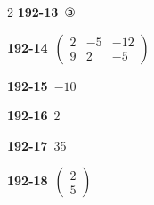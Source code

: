 \documentclass[10pt,a4paper]{article}
\begin{document}
\begin{multicols}{2}
\noindent\textbf{192-13}\ ③\par
\noindent\textbf{192-14}\ $\begin{pmatrix} 2 & -5 & -12 \\ 9 & 2 & -5 \end{pmatrix}$\par
\noindent\textbf{192-15}\ $-10$\par
\noindent\textbf{192-16}\ 2\par
\noindent\textbf{192-17}\ 35\par
\noindent\textbf{192-18}\ $\begin{pmatrix} 2 \\ 5 \end{pmatrix}$\par
\end{multicols}
\end{document}
